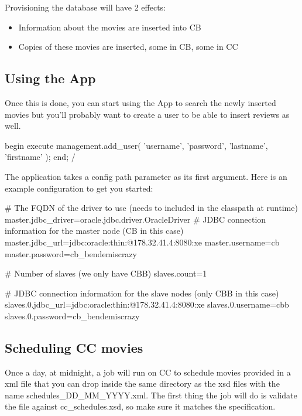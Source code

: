 \documentclass[a4paper]{article}
\begin{document}
Provisioning the database will have 2 effects:
\begin{itemize}
	\item Information about the movies are inserted into CB
	\item Copies of these movies are inserted, some in CB, some in CC
\end{itemize}

\subsection{Using the App}

Once this is done, you can start using the App to search the newly inserted movies but you'll probably want to create a user to be able to insert reviews as well.

\begin{sqlcode}
begin
    execute management.add_user(
        'username',
        'password',
        'lastname',
        'firstname'
    );
end;
/
\end{sqlcode}

The application takes a config path parameter as its first argument. Here is an example configuration to get you started:
\begin{inicode}
# The FQDN of the driver to use (needs to included in the classpath at runtime)
master.jdbc_driver=oracle.jdbc.driver.OracleDriver
# JDBC connection information for the master node (CB in this case)
master.jdbc_url=jdbc:oracle:thin:@178.32.41.4:8080:xe
master.username=cb
master.password=cb_bendemiscrazy

# Number of slaves (we only have CBB)
slaves.count=1

# JDBC connection information for the slave nodes (only CBB in this case)
slaves.0.jdbc_url=jdbc:oracle:thin:@178.32.41.4:8080:xe
slaves.0.username=cbb
slaves.0.password=cb_bendemiscrazy
\end{inicode}

\subsection{Scheduling CC movies}

Once a day, at midnight, a job will run on CC to schedule movies provided in a xml file that you can drop inside the same directory as the xsd files with the name schedules\_DD\_MM\_YYYY.xml. The first thing the job will do is validate the file against cc\_schedules.xsd, so make sure it matches the specification.
\end{document}
